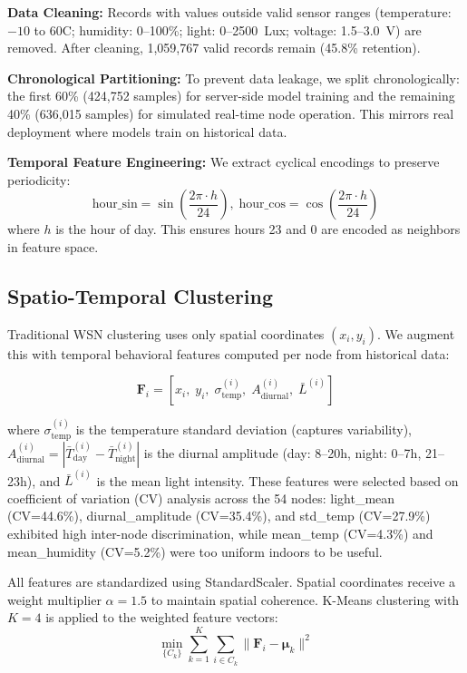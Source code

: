 \documentclass[conference]{IEEEtran}
\begin{document}
\textbf{Data Cleaning:} Records with values outside valid sensor ranges (temperature: $-10$ to $60$\textdegree C; humidity: 0--100\%; light: 0--2500~Lux; voltage: 1.5--3.0~V) are removed. After cleaning, 1,059,767 valid records remain (45.8\% retention).

\textbf{Chronological Partitioning:} To prevent data leakage, we split chronologically: the first 60\% (424,752 samples) for server-side model training and the remaining 40\% (636,015 samples) for simulated real-time node operation. This mirrors real deployment where models train on historical data.

\textbf{Temporal Feature Engineering:} We extract cyclical encodings to preserve periodicity:
\begin{equation}
\text{hour\_sin} = \sin\!\left(\frac{2\pi \cdot h}{24}\right),\;
\text{hour\_cos} = \cos\!\left(\frac{2\pi \cdot h}{24}\right)
\label{eq:cyclical}
\end{equation}
where $h$ is the hour of day. This ensures hours 23 and 0 are encoded as neighbors in feature space.

\subsection{Spatio-Temporal Clustering}

Traditional WSN clustering uses only spatial coordinates $(x_i, y_i)$. We augment this with temporal behavioral features computed per node from historical data:

\begin{equation}
\mathbf{F}_i = \left[x_i,\; y_i,\; \sigma_{\text{temp}}^{(i)},\; A_{\text{diurnal}}^{(i)},\; \bar{L}^{(i)}\right]
\label{eq:features}
\end{equation}

where $\sigma_{\text{temp}}^{(i)}$ is the temperature standard deviation (captures variability), $A_{\text{diurnal}}^{(i)} = |\bar{T}_{\text{day}}^{(i)} - \bar{T}_{\text{night}}^{(i)}|$ is the diurnal amplitude (day: 8--20h, night: 0--7h, 21--23h), and $\bar{L}^{(i)}$ is the mean light intensity. These features were selected based on coefficient of variation (CV) analysis across the 54 nodes: light\_mean (CV=44.6\%), diurnal\_amplitude (CV=35.4\%), and std\_temp (CV=27.9\%) exhibited high inter-node discrimination, while mean\_temp (CV=4.3\%) and mean\_humidity (CV=5.2\%) were too uniform indoors to be useful.

All features are standardized using StandardScaler. Spatial coordinates receive a weight multiplier $\alpha = 1.5$ to maintain spatial coherence. K-Means clustering with $K=4$ is applied to the weighted feature vectors:
\begin{equation}
\min_{\{C_k\}} \sum_{k=1}^{K} \sum_{i \in C_k} \|\mathbf{F}_i - \boldsymbol{\mu}_k\|^2
\label{eq:kmeans}
\end{equation}
\end{document}
